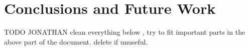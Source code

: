 \chapter{Conclusions and Future Work}

{\color{red}TODO JONATHAN clean everything below , try to fit important parts in the above part of the document. delete if unuseful.}